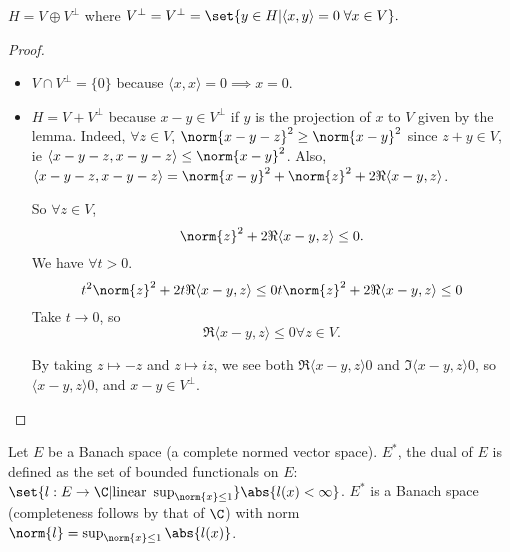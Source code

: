 \documentclass{article}
\newcommand{\1}[1]{\mathbbm{1}_{#1}}
\begin{document}

\clearpage
\begin{cor}
    $H = V \oplus V^\bot$ where $V^\bot = V^\bot = \set{y \in H| \langle x, y\rangle = 0 \; \forall x \in V}.$
\end{cor}

\begin{proof}
    \leavevmode
    \begin{itemize}
        \item $V \cap V^\bot = \{0\}$ because $\langle x, x \rangle = 0 \implies x = 0$.
        \item $H = V + V^\bot$ because $x - y \in V^\bot$ if $y$ is the projection of $x$ to $V$ given by the lemma.
            Indeed, $\forall z \in V$, $\norm{x - y - z}^2 \geq \norm{x - y}^2$ since $z + y \in V$, ie $\langle x - y - z, x - y - z \rangle \leq \norm{x - y}^2$.
            Also, $\langle x - y - z, x - y - z \rangle = \norm{x - y}^2    + \norm{z}^2 + 2 \Re \langle x - y, z \rangle$.

            So $\forall z \in V$,
            \begin{equation*}
                \norm{z}^2 + 2 \Re \langle x - y, z \rangle \leq 0.
            \end{equation*}
            We have $\forall t > 0$.
            \begin{equation*}
                t^2 \norm{z}^2 + 2 t \Re \langle x - y, z \rangle \leq 0 \\
                t \norm{z}^2 + 2 \Re \langle x - y, z \rangle \leq 0
            \end{equation*}
            Take $t \to 0$, so
            \begin{equation*}
                \Re \langle x - y, z \rangle \leq 0 \forall z \in V.
            \end{equation*}

            By taking $z \mapsto -z$ and $z \mapsto iz$, we see both $\Re \langle x - y, z \rangle 0$ and $\Im \langle x - y, z \rangle 0$, so $\langle x - y, z \rangle 0$, and $x - y \in V^\bot$.
    \end{itemize}
\end{proof}

Let $E$ be a Banach space (a complete normed vector space).
$E^*$, the dual of $E$ is defined as the set of bounded functionals on $E$: $\set{l: E \to \C | \text{linear } \sup_{\norm{x} \leq 1}} \abs{l(x) < \infty}$.
$E^*$ is a Banach space (completeness follows by that of $\C$) with norm $\norm{l} = \sup_{\norm{x} \leq 1} \abs{l(x)}$.
\end{document}
